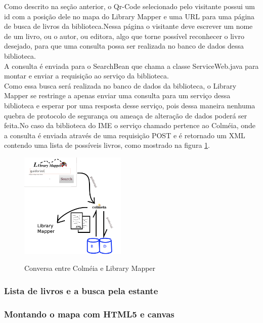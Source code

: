\documentclass[a4paper,10pt]{article}
\begin{document}
	Como descrito na seção anterior, o Qr-Code selecionado pelo visitante possui um id com a posição dele no mapa do Library Mapper 
	e uma
	URL para uma página de busca de livros da biblioteca.Nessa página o visitante deve escrever um nome de um livro, ou o autor, 
	ou editora,
	 algo que torne possível reconhecer o livro desejado, para que uma consulta possa ser realizada no banco de dados dessa biblioteca.\\
	
	A consulta é enviada para o SearchBean que chama a classe ServiceWeb.java para montar e enviar a requisição ao serviço da biblioteca.\\

	Como essa busca será realizada no banco de dados da biblioteca, o Library Mapper se restringe a apenas enviar uma consulta para um serviço 
	 dessa biblioteca e esperar por uma resposta desse serviço, pois dessa maneira nenhuma quebra de protocolo de segurança ou ameaça de
	 alteração de 
	dados poderá ser feita.No caso da biblioteca do IME o serviço chamado pertence ao Colméia, onde a consulta é enviada através 
	de uma requisição
	POST e é retornado um XML contendo uma lista de possíveis livros, como mostrado na figura \ref{colmeia}.

		\begin{figure}[H]
	\centering
	\includegraphics[width=0.45\textwidth]{./imgs/colmeia.png}\\[0.5cm]   
	\caption{Conversa entre Colméia e Library Mapper}
	\label{colmeia}
\end{figure}
	\subsubsection{Lista de livros e a busca pela estante}
	
	\subsubsection{Montando o mapa com HTML5 e canvas}
\end{document}
